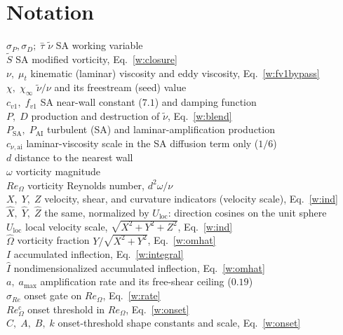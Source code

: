 \documentclass[10pt]{article}
\begin{document}
\section*{Notation}
\begin{tabbing}
  $\sigma_P,\sigma_D;\;\tau$\quad\quad \= \kill
  $\tilde\nu$ \> SA working variable \\
  $\tilde S$ \> SA modified vorticity, Eq.~\eqref{w:closure} \\
  $\nu,\;\mu_t$ \> kinematic (laminar) viscosity and eddy viscosity, Eq.~\eqref{w:fv1bypass} \\
  $\chi,\;\chi_\infty$ \> $\tilde\nu/\nu$ and its freestream (seed) value \\
  $c_{v1},\;f_{v1}$ \> SA near-wall constant ($7.1$) and damping function \\
  $P,\;D$ \> production and destruction of $\tilde\nu$, Eq.~\eqref{w:blend} \\
  $P_\mathrm{SA},\;P_\mathrm{AI}$ \> turbulent (SA) and laminar-amplification production \\
  $c_{\nu,\mathrm{ai}}$ \> laminar-viscosity scale in the SA diffusion term only ($1/6$) \\
  $d$ \> distance to the nearest wall \\
  $\omega$ \> vorticity magnitude \\
  $Re_\Omega$ \> vorticity Reynolds number, $d^2\omega/\nu$ \\
  $X,\;Y,\;Z$ \> velocity, shear, and curvature indicators (velocity scale), Eq.~\eqref{w:ind} \\
  $\hat X,\;\hat Y,\;\hat Z$ \> the same, normalized by $U_\mathrm{loc}$: direction cosines on the unit sphere \\
  $U_\mathrm{loc}$ \> local velocity scale, $\sqrt{X^2+Y^2+Z^2}$, Eq.~\eqref{w:ind} \\
  $\hat\Omega$ \> vorticity fraction $Y/\sqrt{X^2+Y^2}$, Eq.~\eqref{w:omhat} \\
  $I$ \> accumulated inflection, Eq.~\eqref{w:integral} \\
  $\hat I$ \> nondimensionalized accumulated inflection, Eq.~\eqref{w:omhat} \\
  $a,\;a_{\max}$ \> amplification rate and its free-shear ceiling ($0.19$) \\
  $\sigma_{Re}$ \> onset gate on $Re_\Omega$, Eq.~\eqref{w:rate} \\
  $Re_\Omega^{\mathrm c}$ \> onset threshold in $Re_\Omega$, Eq.~\eqref{w:onset} \\
  $C,\;A,\;B,\;k$ \> onset-threshold shape constants and scale, Eq.~\eqref{w:onset} \\

\end{tabbing}
\end{document}
